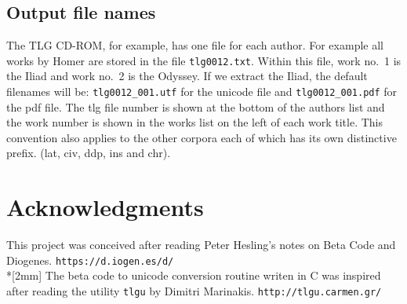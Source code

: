 \documentclass[11pt,a4paper]{article}
\begin{document}
  \subsection{Output file names} The TLG CD-ROM, for example,
    has one file for each author. For
    example all works by Homer are stored in the file {\tt tlg0012.txt}. Within
    this file, work no.\ 1 is the Iliad and work no.\ 2 is the Odyssey.
    If we extract the Iliad, the
    default filenames will be: {\tt tlg0012\_001.utf} for the unicode file and
    {\tt tlg0012\_001.pdf} for the pdf file. The tlg file number is shown at the
    bottom of the authors list
    and the work number is shown in the works list on the
    left of each work title.
    This convention also applies to the other corpora each of
    which has its own distinctive prefix. (lat, civ, ddp, ins and chr).
\section{Acknowledgments}
    This project was conceived after reading Peter Hesling's
    notes on Beta Code and Diogenes. {\tt https://d.iogen.es/d/}\\*[2mm]
    The beta code to unicode conversion routine writen in C
    was inspired after reading the utility {\tt tlgu} by Dimitri Marinakis.
    {\tt http://tlgu.carmen.gr/}
\end{document}
